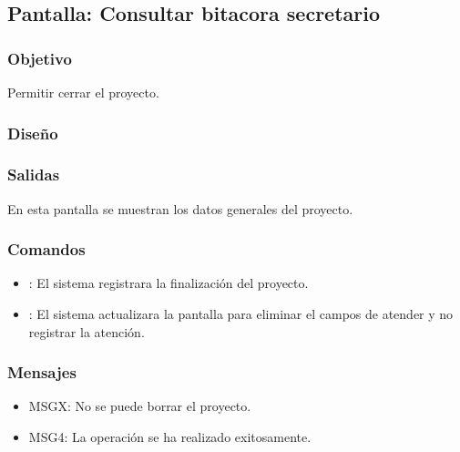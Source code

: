 \subsection{Pantalla: Consultar bitacora secretario}

\subsubsection{Objetivo}
  Permitir cerrar el proyecto.

\subsubsection{Diseño}

\subsubsection{Salidas}
  En esta pantalla se muestran los datos generales del proyecto.

\subsubsection{Comandos}
\begin{itemize}
 \item {}: El sistema registrara la finalización del proyecto.
 \item {}: El sistema actualizara la pantalla  para eliminar el campos de atender y no registrar la atención.
\end{itemize}

\subsubsection{Mensajes}
\begin{itemize}
  \item MSGX: No se puede borrar el proyecto.
  \item MSG4: La operación se ha realizado exitosamente.
\end{itemize}